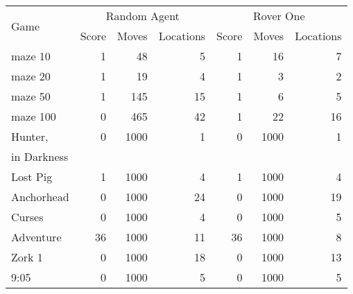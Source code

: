 \begin{tabular}{l|rrr|rrr}
\toprule
\multirow{2}{*}{Game} & \multicolumn{3}{c|}{Random Agent} & \multicolumn{3}{c}{Rover One}\\
\cmidrule{2-7}
& Score & Moves & Locations & Score & Moves & Locations \\
\midrule
maze 10 & 1 & 48 & 5 & 1 & 16 & 7 \\
maze 20 & 1 & 19 & 4 & 1 & 3 & 2 \\
maze 50 & 1 & 145 & 15 & 1 & 6 & 5 \\
maze 100 & 0 & 465 & 42 & 1 & 22 & 16 \\
Hunter, & 0 & 1000 & 1 & 0 & 1000 & 1 \\
in Darkness &&&&&& \\
Lost Pig & 1 & 1000 & 4 & 1 & 1000 & 4 \\
Anchorhead & 0 & 1000 & 24 & 0 & 1000 & 19 \\
Curses & 0 & 1000 & 4 & 0 & 1000 & 5 \\
Adventure & 36 & 1000 & 11 & 36 & 1000 & 8 \\
Zork 1 & 0 & 1000 & 18 & 0 & 1000 & 13 \\
9:05 & 0 & 1000 & 5 & 0 & 1000 & 5 \\
\bottomrule
\end{tabular}
